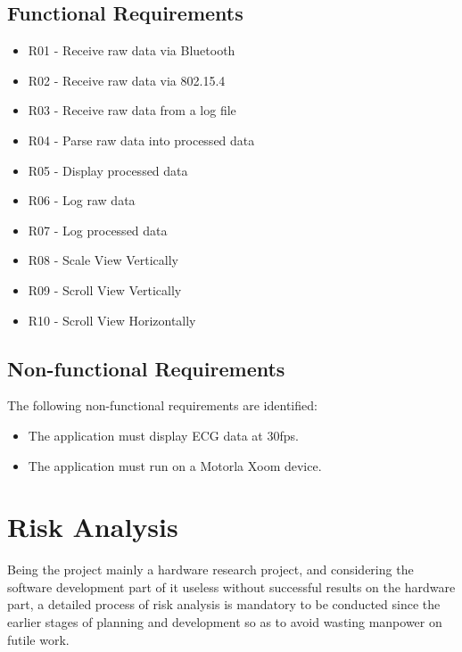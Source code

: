 		\subsection{Functional Requirements}
		\begin{itemize}
		\item R01 - Receive raw data via Bluetooth
		\item R02 - Receive raw data via 802.15.4
		\item R03 - Receive raw data from a log file
		\item R04 - Parse raw data into processed data
		\item R05 - Display processed data
		\item R06 - Log raw data
		\item R07 - Log processed data	%
		\item R08 - Scale View Vertically
		\item R09 - Scroll View Vertically
		\item R10 - Scroll View Horizontally
		\end{itemize}


		\subsection{Non-functional Requirements}

		The following non-functional requirements are identified:
		\begin{itemize}
			\item The application must display ECG data at 30fps.
			\item The application must run on a Motorla Xoom device.
		\end{itemize}

	\section{Risk Analysis}
	\label{sec:sw-risks}

		Being the project mainly a hardware research project, and considering the software development part of it useless without successful results on the hardware part, a detailed process of risk analysis is mandatory to be conducted since the earlier stages of planning and development so as to avoid wasting manpower on futile work.\\

